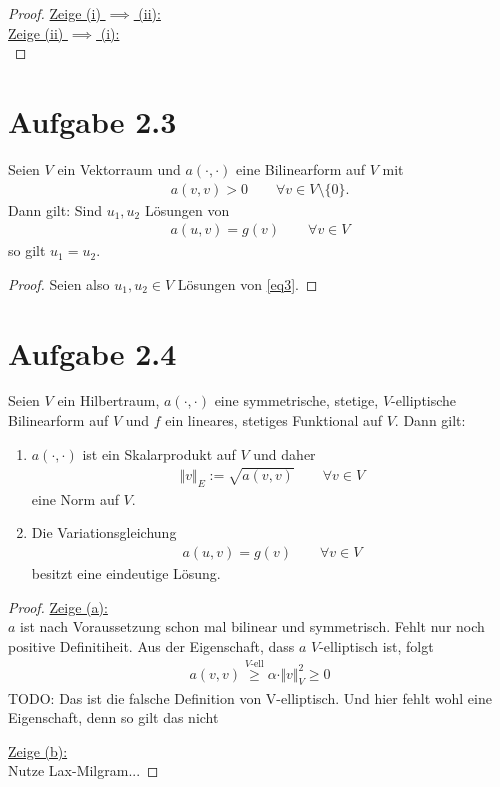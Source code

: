 \documentclass[12pt,a4paper]{article}
\begin{document}
\begin{proof}
\underline{Zeige (i) $\implies$ (ii):}\\

\underline{Zeige (ii) $\implies$ (i):}\\

\end{proof}

\section*{Aufgabe 2.3}
Seien $V$ ein Vektorraum und $a(\cdot,\cdot)$ eine Bilinearform auf $V$ mit
\begin{align*}
a(v,v)>0\qquad\forall v\in V\setminus\lbrace0\rbrace.
\end{align*}
Dann gilt: Sind $u_1,u_2$ Lösungen von
\begin{align}\label{eq3}
a(u,v)=g(v)\qquad\forall v\in V
\end{align}
so gilt $u_1=u_2$.

\begin{proof}
Seien also $u_1,u_2\in V$ Lösungen von \eqref{eq3}. 


\end{proof}


\section*{Aufgabe 2.4}
Seien $V$ ein Hilbertraum, $a(\cdot,\cdot)$ eine symmetrische, stetige, $V$-elliptische Bilinearform auf $V$ und $f$ ein lineares, stetiges Funktional auf $V$. Dann gilt:

\begin{enumerate}[label=(\alph*)]
\item $a(\cdot,\cdot)$ ist ein Skalarprodukt auf $V$ und daher
\begin{align*}
\Vert v\Vert_E:=\sqrt{a(v,v)}\qquad\forall v\in V
\end{align*}
eine Norm auf $V$.
\item Die Variationsgleichung
\begin{align*}
a(u,v)=g(v)\qquad\forall v\in V
\end{align*}
besitzt eine eindeutige Lösung.
\end{enumerate}
\begin{proof}
\underline{Zeige (a):}\\
$a$ ist nach Voraussetzung schon mal bilinear und symmetrisch. Fehlt nur noch positive Definitiheit. Aus der Eigenschaft, dass $a$ $V$-elliptisch ist, folgt
\begin{align*}
a(v,v)\stackrel{V\text{-ell}}{\geq}
\alpha\cdot\Vert v\Vert^2_V\geq0
\end{align*}
TODO: Das ist die falsche Definition von V-elliptisch. Und hier fehlt wohl eine Eigenschaft, denn so gilt das nicht

\underline{Zeige (b):}\\
Nutze Lax-Milgram...

\end{proof}
\end{document}
